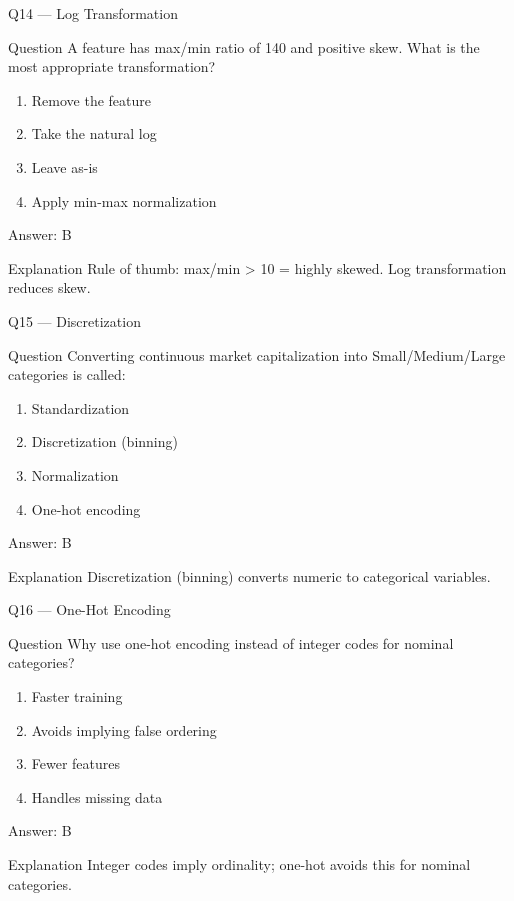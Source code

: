 \documentclass[aspectratio=169,8pt]{beamer}
\begin{document}
	\begin{frame}{Q14 --- Log Transformation}
		\begin{block}{Question}
			A feature has max/min ratio of 140 and positive skew. What is the most appropriate transformation?
		\end{block}
		\begin{enumerate}
			\item Remove the feature
			\item Take the natural log
			\item Leave as-is
			\item Apply min-max normalization
		\end{enumerate}
		\begin{exampleblock}{Answer: B}\end{exampleblock}
		\begin{block}{Explanation}
			Rule of thumb: max/min > 10 = highly skewed. Log transformation reduces skew.
		\end{block}
	\end{frame}
	
	\begin{frame}{Q15 --- Discretization}
		\begin{block}{Question}
			Converting continuous market capitalization into Small/Medium/Large categories is called:
		\end{block}
		\begin{enumerate}
			\item Standardization
			\item Discretization (binning)
			\item Normalization
			\item One-hot encoding
		\end{enumerate}
		\begin{exampleblock}{Answer: B}\end{exampleblock}
		\begin{block}{Explanation}
			Discretization (binning) converts numeric to categorical variables.
		\end{block}
	\end{frame}
	
	\begin{frame}{Q16 --- One-Hot Encoding}
		\begin{block}{Question}
			Why use one-hot encoding instead of integer codes for nominal categories?
		\end{block}
		\begin{enumerate}
			\item Faster training
			\item Avoids implying false ordering
			\item Fewer features
			\item Handles missing data
		\end{enumerate}
		\begin{exampleblock}{Answer: B}\end{exampleblock}
		\begin{block}{Explanation}
			Integer codes imply ordinality; one-hot avoids this for nominal categories.
		\end{block}
	\end{frame}
	
\end{document}
